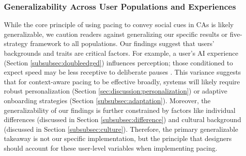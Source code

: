\subsubsection{Generalizability Across User Populations and Experiences}
While the core principle of using pacing to convey social cues in CAs is likely generalizable, we caution readers against generalizing our specific results or five-strategy framework to all populations.
Our findings suggest that users' backgrounds and traits are critical factors.
For example, a user's AI experience (Section \ref{subsubsec:doubleedged}) influences perception; those conditioned to expect speed may be less receptive to deliberate pauses \cite{10.1145/3290605.3300768,gnewuch2022opposing}.
This variance suggests that for context-aware pacing to be effective broadly, systems will likely require robust personalization (Section \ref{sec:discussion:personalization}) or adaptive onboarding strategies (Section \ref{subsubsec:adaptation}). 
Moreover, the generalizability of our findings is further constrained by factors like individual differences \cite{stein2024attitudes} (discussed in Section \ref{subsubsec:difference}) and cultural background \cite{quan2015analysis, ling2003communicative} (discussed in Section \ref{subsubsec:culture}). 
Therefore, the primary generalizable takeaway is not our specific implementation, but the principle that designers should account for these user-level variables when implementing pacing.



